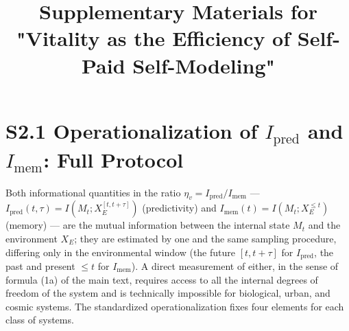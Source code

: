 \documentclass[pdflatex,sn-mathphys-ay]{sn-jnl}
\begin{document}
\title[Supplementary Materials]{Supplementary Materials for "Vitality as the Efficiency of Self-Paid Self-Modeling"}

\author*[1]{ }


\maketitle

\section*{\texorpdfstring{S2.1 Operationalization of \(I_{\text{pred}}\) and \(I_{\text{mem}}\): Full Protocol}{S2.1 Operationalization of I\_\{\textbackslash text\{pred\}\} and I\_\{\textbackslash text\{mem\}\}: Full Protocol}}\label{s2.1-operationalization-of-i_textpred-and-i_textmem-full-protocol}

Both informational quantities in the ratio \(\eta_v = I_{\text{pred}}/I_{\text{mem}}\) --- \(I_{\text{pred}}(t,\tau) = I(M_t; X_E^{[t, t+\tau]})\) (predictivity) and \(I_{\text{mem}}(t) = I(M_t; X_E^{\le t})\) (memory) --- are the mutual information between the internal state \(M_t\) and the environment \(X_E\); they are estimated by one and the same sampling procedure, differing only in the environmental window (the future \([t, t+\tau]\) for \(I_{\text{pred}}\), the past and present \(\le t\) for \(I_{\text{mem}}\)). A direct measurement of either, in the sense of formula (1a) of the main text, requires access to all the internal degrees of freedom of the system and is technically impossible for biological, urban, and cosmic systems. The standardized operationalization fixes four elements for each class of systems.
\end{document}
